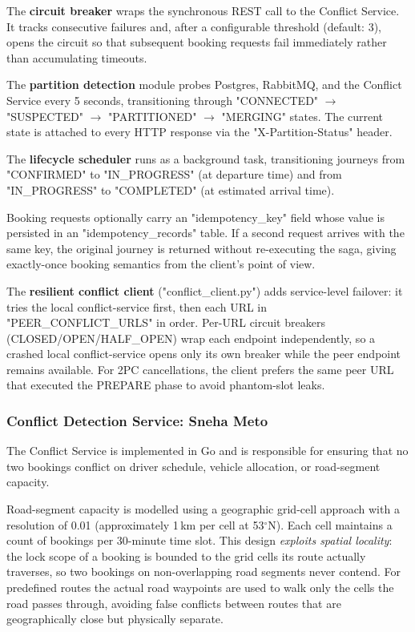 \documentclass[11pt,a4paper]{article}
\begin{document}
The \textbf{circuit breaker} wraps the synchronous REST call to the Conflict Service. It tracks consecutive failures and, after a configurable threshold (default: 3), opens the circuit so that subsequent booking requests fail immediately rather than accumulating timeouts.
 
The \textbf{partition detection} module probes Postgres, RabbitMQ, and the Conflict Service every 5 seconds, transitioning through "CONNECTED" $\rightarrow$ "SUSPECTED" $\rightarrow$ "PARTITIONED" $\rightarrow$ "MERGING" states. The current state is attached to every HTTP response via the "X-Partition-Status" header.
 
The \textbf{lifecycle scheduler} runs as a background task, transitioning journeys from "CONFIRMED" to "IN\_PROGRESS" (at departure time) and from "IN\_PROGRESS" to "COMPLETED" (at estimated arrival time).

Booking requests optionally carry an "idempotency\_key" field whose value is persisted in an "idempotency\_records" table. If a second request arrives with the same key, the original journey is returned without re-executing the saga, giving exactly-once booking semantics from the client's point of view.

The \textbf{resilient conflict client} ("conflict\_client.py") adds service-level failover: it tries the local conflict-service first, then each URL in "PEER\_CONFLICT\_URLS" in order. Per-URL circuit breakers (CLOSED/OPEN/HALF\_OPEN) wrap each endpoint independently, so a crashed local conflict-service opens only its own breaker while the peer endpoint remains available. For 2PC cancellations, the client prefers the same peer URL that executed the PREPARE phase to avoid phantom-slot leaks.
\subsubsection{Conflict Detection Service: Sneha Meto}
 
The Conflict Service is implemented in Go and is responsible for ensuring that no two bookings conflict on driver schedule, vehicle allocation, or road-segment capacity.
 
Road-segment capacity is modelled using a geographic grid-cell approach with a resolution of 0.01\textdegree{} (approximately 1\,km per cell at 53$^\circ$N). Each cell maintains a count of bookings per 30-minute time slot. This design \emph{exploits spatial locality}: the lock scope of a booking is bounded to the grid cells its route actually traverses, so two bookings on non-overlapping road segments never contend. For predefined routes the actual road waypoints are used to walk only the cells the road passes through, avoiding false conflicts between routes that are geographically close but physically separate.
\end{document}
